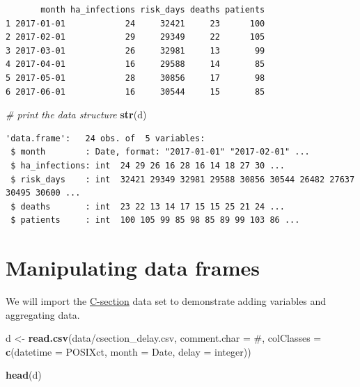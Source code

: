\documentclass[
]{book}
\newenvironment{Shaded}{\begin{snugshade}}{\end{snugshade}}
\newcommand{\AttributeTok}[1]{\textcolor[rgb]{0.13,0.29,0.53}{#1}}
\newcommand{\CommentTok}[1]{\textcolor[rgb]{0.56,0.35,0.01}{\textit{#1}}}
\newcommand{\FunctionTok}[1]{\textcolor[rgb]{0.13,0.29,0.53}{\textbf{#1}}}
\newcommand{\NormalTok}[1]{#1}
\newcommand{\OtherTok}[1]{\textcolor[rgb]{0.56,0.35,0.01}{#1}}
\newcommand{\StringTok}[1]{\textcolor[rgb]{0.31,0.60,0.02}{#1}}
\begin{document}
\begin{verbatim}
       month ha_infections risk_days deaths patients
1 2017-01-01            24     32421     23      100
2 2017-02-01            29     29349     22      105
3 2017-03-01            26     32981     13       99
4 2017-04-01            16     29588     14       85
5 2017-05-01            28     30856     17       98
6 2017-06-01            16     30544     15       85
\end{verbatim}

\begin{Shaded}
\begin{Highlighting}[]
\CommentTok{\# print the data structure}
\FunctionTok{str}\NormalTok{(d)}
\end{Highlighting}
\end{Shaded}

\begin{verbatim}
'data.frame':   24 obs. of  5 variables:
 $ month        : Date, format: "2017-01-01" "2017-02-01" ...
 $ ha_infections: int  24 29 26 16 28 16 14 18 27 30 ...
 $ risk_days    : int  32421 29349 32981 29588 30856 30544 26482 27637 30495 30600 ...
 $ deaths       : int  23 22 13 14 17 15 15 25 21 24 ...
 $ patients     : int  100 105 99 85 98 85 89 99 103 86 ...
\end{verbatim}

\section{Manipulating data frames}\label{manipulating-data-frames}

We will import the \hyperref[ceasearian-section-delay]{C-section} data
set to demonstrate adding variables and aggregating data.

\begin{Shaded}
\begin{Highlighting}[]
\NormalTok{d }\OtherTok{\textless{}{-}} \FunctionTok{read.csv}\NormalTok{(}\StringTok{\textquotesingle{}data/csection\_delay.csv\textquotesingle{}}\NormalTok{,}
              \AttributeTok{comment.char =} \StringTok{\textquotesingle{}\#\textquotesingle{}}\NormalTok{,}
              \AttributeTok{colClasses   =} \FunctionTok{c}\NormalTok{(}\AttributeTok{datetime =} \StringTok{\textquotesingle{}POSIXct\textquotesingle{}}\NormalTok{,}
                               \AttributeTok{month    =} \StringTok{\textquotesingle{}Date\textquotesingle{}}\NormalTok{,}
                               \AttributeTok{delay    =} \StringTok{\textquotesingle{}integer\textquotesingle{}}\NormalTok{))}

\FunctionTok{head}\NormalTok{(d)}
\end{Highlighting}
\end{Shaded}
\end{document}
